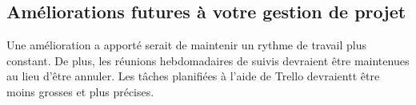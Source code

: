 \subsection{Améliorations futures à votre gestion de projet}

\begin{spacing}{1.5}
    Une amélioration a apporté serait de maintenir un rythme de travail plus constant. De plus, les réunions hebdomadaires de suivis devraient être maintenues au lieu d'être annuler. Les tâches planifiées à l'aide de Trello devraientt être moins grosses et plus précises.
\end{spacing}

